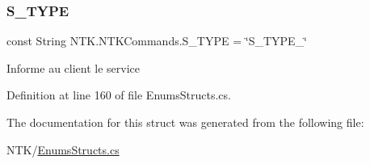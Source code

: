 \subsubsection{\texorpdfstring{S\_TYPE}{S\_TYPE}}
{\footnotesize\ttfamily const String N\+T\+K.\+N\+T\+K\+Commands.\+S\+\_\+\+T\+Y\+PE = \char`\"{}S\+\_\+\+T\+Y\+P\+E\+\_\+\char`\"{}}



Informe au client le service 



Definition at line 160 of file Enums\+Structs.\+cs.



The documentation for this struct was generated from the following file\+:\begin{DoxyCompactItemize}
\item 
N\+T\+K/\mbox{\hyperlink{_enums_structs_8cs}{Enums\+Structs.\+cs}}\end{DoxyCompactItemize}

